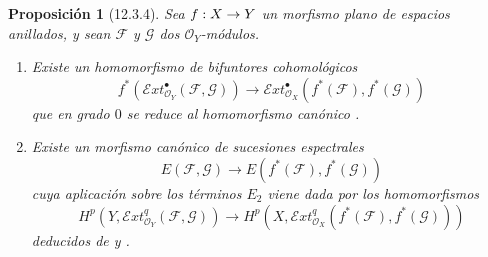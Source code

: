 \documentclass[10pt,oneside,openany]{book}
\theoremstyle{egaenv}\newtheorem*{env}{---}
\theoremstyle{egastatement}
\newtheorem*{proposition}{Proposición}
\theoremstyle{egadescription}
\newcommand{\oldpage}[2][]{\marginnote{\normalfont\scriptsize\textbf{#1}\,|\,#2}\ignorespaces}
\renewcommand{\to}{\mathchoice{\longrightarrow}{\rightarrow}{\rightarrow}{\rightarrow}}
\begin{document}
\oldpage[0\textsubscript{III}]{61}
\begin{proposition}[12.3.4]
\label{0.12.3.4}
\label{0.12.3.4-fr}
Sea $f:X\to Y$ un morfismo \textup{plano} de espacios anillados, y sean
$\mathcal F$ y $\mathcal G$ dos $\mathcal O_Y$-módulos.
\begin{enumerate}
  \item[\rm(i)] Existe un homomorfismo de bifuntores cohomológicos
  \[
\label{0.12.3.4.1-fr}
\tag{12.3.4.1}
f^*(\mathcal{E}xt_{\mathcal O_Y}^{\bullet}(\mathcal F,\mathcal G))
\longrightarrow
\mathcal{E}xt_{\mathcal O_X}^{\bullet}(f^*(\mathcal F),f^*(\mathcal G))
\]
  que en grado $0$ se reduce al homomorfismo canónico
  .

  \item[\rm(ii)] Existe un morfismo canónico de sucesiones espectrales
  \[
\label{0.12.3.4.2-fr}
\tag{12.3.4.2}
E(\mathcal F,\mathcal G)\longrightarrow
E(f^*(\mathcal F),f^*(\mathcal G))
\]
  cuya aplicación sobre los términos $E_2$ viene dada por los homomorfismos
  \[
\label{0.12.3.4.3-fr}
\tag{12.3.4.3}
H^p(Y,\mathcal{E}xt_{\mathcal O_Y}^q(\mathcal F,\mathcal G))
\longrightarrow
H^p(X,\mathcal{E}xt_{\mathcal O_X}^q(f^*(\mathcal F),f^*(\mathcal G)))
\]
  deducidos de  y .
\end{enumerate}
\end{proposition}
\end{document}
